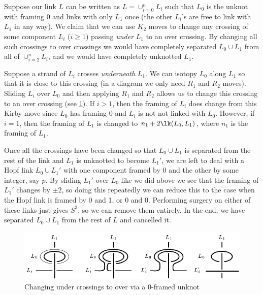 \begin{example}
\label{removing unknotted 0-framed components}
Suppose our link $L$ can be written as $L = \cup_{i=0}^n L_i$ such that $L_0$ is the unknot with framing 0 and links with only $L_1$ once (the other $L_i$'s are free to link with $L_1$ in any way). We claim that we can use $K_2$ moves to change any crossing of some component $L_i$ ($i \geq 1$) passing \emph{under} $L_1$ to an over crossing. By changing all such crossings to over crossings we would have completely separated $L_0 \cup L_1$ from all of $\cup_{i=2}^n L_i$, and we would have completely unknotted $L_1$. 

Suppose a strand of $L_i$ crosses \emph{underneath} $L_1$. We can isotopy $L_0$ along $L_1$ so that it is close to this crossing (in a diagram we only need $R_1$ and $R_2$ moves). Sliding $L_i$ over $L_0$ and then applying $R_1$ and $R_2$ allows us to change this crossing to an over crossing (see \cref{removing-unknotted-0-frame}). If $i > 1$, then the framing of $L_i$ does change from this Kirby move since $L_0$ has framing 0 and $L_i$ is not not linked with $L_0$. However, if $i=1$, then the framing of $L_1$ is changed to $n_1 + 2\lk(L_0,L_1)$, where $n_1$ is the framing of $L_1$.

Once all the crossings have been changed so that $L_0 \cup L_1$ is separated from the rest of the link and $L_1$ is unknotted to become $L_1'$, we are left to deal with a Hopf link $L_0 \cup L_1'$ with one component framed by 0 and the other by some integer, say $p$. By sliding $L_1'$ over $L_0$ like we did above we see that the framing of $L_1'$ changes by $\pm 2$, so doing this repeatedly we can reduce this to the case when the Hopf link is framed by 0 and 1, or 0 and 0. Performing surgery on either of these links just gives $S^3$, so we can remove them entirely. In the end, we have separated $L_0 \cup L_1$ from the rest of $L$ and cancelled it.

\begin{figure}[tb]
\centering
\includegraphics[scale=.6]{graphics/removing-unknotted-0-frame}
\caption{Changing under crossings to over via a 0-framed unknot}
\label{removing-unknotted-0-frame}
\end{figure}
\end{example}

